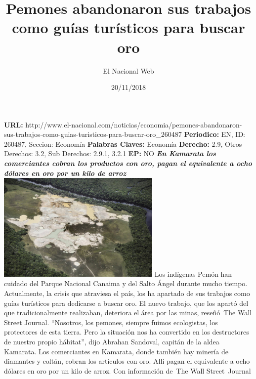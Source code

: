 \documentclass{article}%
\title{\textbf{Pemones abandonaron sus trabajos como guías turísticos para buscar oro}}%
\author{El Nacional Web}%
\date{20/11/2018}%
\begin{document}
%
\normalsize%
\maketitle%
\textbf{URL: }%
http://www.el{-}nacional.com/noticias/economia/pemones{-}abandonaron{-}sus{-}trabajos{-}como{-}guias{-}turisticos{-}para{-}buscar{-}oro\_260487\newline%
%
\textbf{Periodico: }%
EN, %
ID: %
260487, %
Seccion: %
Economía\newline%
%
\textbf{Palabras Claves: }%
Economía\newline%
%
\textbf{Derecho: }%
2.9, %
Otros Derechos: %
3.2, %
Sub Derechos: %
2.9.1, 3.2.1\newline%
%
\textbf{EP: }%
NO\newline%
\newline%
%
\textbf{\textit{En Kamarata los comerciantes cobran los productos con oro, pagan el equivalente a ocho dólares en oro por un kilo de arroz}}%
\newline%
\newline%
%
\includegraphics[width=300px]{53.jpg}%
\newline%
%
Los indígenas Pemón han cuidado del Parque Nacional Canaima y del Salto Ángel durante mucho tiempo. Actualmente, la crisis que atraviesa el país, los ha apartado de sus trabajos como guías turísticos para dedicarse a buscar oro.%
\newline%
%
El nuevo trabajo, que los apartó del que tradicionalmente realizaban, deteriora el área por las minas, reseñó~The Wall Street Journal.%
\newline%
%
“Nosotros, los pemones, siempre fuimos ecologistas, los protectores de esta tierra. Pero la situación nos ha convertido en los destructores de nuestro propio hábitat”, dijo Abrahan Sandoval, capitán de la aldea Kamarata.%
\newline%
%
Los comerciantes en Kamarata, donde también hay minería de diamantes y coltán, cobran los artículos con oro. Allí pagan el equivalente a ocho dólares en oro por un kilo de arroz.%
\newline%
%
Con información de~The Wall Street~Journal%
\newline%
%
\end{document}
